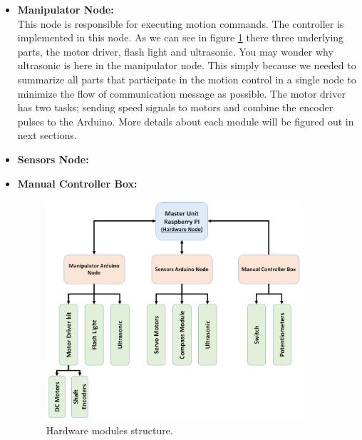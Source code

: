 \documentclass[12pt]{article}
\begin{document}
\begin{itemize}
	\item \textbf{Manipulator Node:}\\
	This node is responsible for executing motion commands. The controller is implemented in this node. As we can see in figure \ref{fig:harware-structure} there three underlying parts, the motor driver, flash light and ultrasonic. You may wonder why ultrasonic is here in the manipulator node. This simply because we needed to summarize all parts that participate in the motion control in a single node to minimize the flow of communication message as possible. The motor driver has two tasks; sending speed signals to motors and combine the encoder pulses to the Arduino. More details about each module will be figured out in next sections.
	
	\item \textbf{Sensors Node:}\\
	
	
	\item \textbf{Manual Controller Box:}\\
	
	\begin{figure}[H]
		\centering
		\includegraphics[width =0.9\textwidth]{Fig/hardware-structure.png}
		\caption{Hardware modules structure.}
		\label{fig:harware-structure}
	\end{figure}

	
\end{itemize}



\newpage
\end{document}
